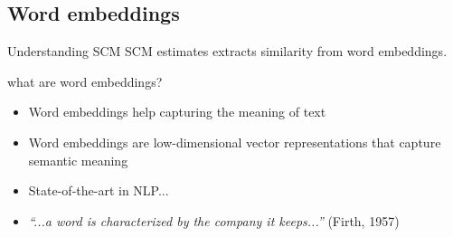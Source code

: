 \documentclass[compress]{beamer}
\begin{document}
\subsection{Word embeddings}

\begin{frame}{Understanding SCM}
SCM estimates extracts similarity from \alert{word embeddings}. 
	\begin{block}{what are word embeddings?}
		\begin{itemize}
			\item<1->Word embeddings help capturing the meaning of text
			\item<2->Word embeddings are low-dimensional vector representations that capture semantic meaning
			\item<3->State-of-the-art in NLP...
			\item<4-> \emph{``...a word is characterized by the company it keeps...''} (Firth, 1957)
		\end{itemize}
	\end{block}
\end{frame}

\begin{frame}{}
\end{frame}

\begin{frame}{}
\end{frame}
\end{document}
